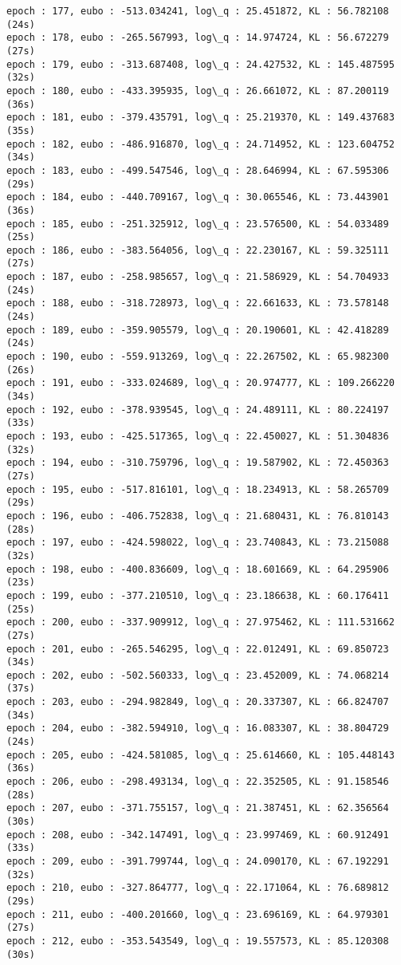 \documentclass[11pt]{article}
\begin{document}
\begin{Verbatim}[commandchars=\\\{\}]
epoch : 177, eubo : -513.034241, log\_q : 25.451872, KL : 56.782108 (24s)
epoch : 178, eubo : -265.567993, log\_q : 14.974724, KL : 56.672279 (27s)
epoch : 179, eubo : -313.687408, log\_q : 24.427532, KL : 145.487595 (32s)
epoch : 180, eubo : -433.395935, log\_q : 26.661072, KL : 87.200119 (36s)
epoch : 181, eubo : -379.435791, log\_q : 25.219370, KL : 149.437683 (35s)
epoch : 182, eubo : -486.916870, log\_q : 24.714952, KL : 123.604752 (34s)
epoch : 183, eubo : -499.547546, log\_q : 28.646994, KL : 67.595306 (29s)
epoch : 184, eubo : -440.709167, log\_q : 30.065546, KL : 73.443901 (36s)
epoch : 185, eubo : -251.325912, log\_q : 23.576500, KL : 54.033489 (25s)
epoch : 186, eubo : -383.564056, log\_q : 22.230167, KL : 59.325111 (27s)
epoch : 187, eubo : -258.985657, log\_q : 21.586929, KL : 54.704933 (24s)
epoch : 188, eubo : -318.728973, log\_q : 22.661633, KL : 73.578148 (24s)
epoch : 189, eubo : -359.905579, log\_q : 20.190601, KL : 42.418289 (24s)
epoch : 190, eubo : -559.913269, log\_q : 22.267502, KL : 65.982300 (26s)
epoch : 191, eubo : -333.024689, log\_q : 20.974777, KL : 109.266220 (34s)
epoch : 192, eubo : -378.939545, log\_q : 24.489111, KL : 80.224197 (33s)
epoch : 193, eubo : -425.517365, log\_q : 22.450027, KL : 51.304836 (32s)
epoch : 194, eubo : -310.759796, log\_q : 19.587902, KL : 72.450363 (27s)
epoch : 195, eubo : -517.816101, log\_q : 18.234913, KL : 58.265709 (29s)
epoch : 196, eubo : -406.752838, log\_q : 21.680431, KL : 76.810143 (28s)
epoch : 197, eubo : -424.598022, log\_q : 23.740843, KL : 73.215088 (32s)
epoch : 198, eubo : -400.836609, log\_q : 18.601669, KL : 64.295906 (23s)
epoch : 199, eubo : -377.210510, log\_q : 23.186638, KL : 60.176411 (25s)
epoch : 200, eubo : -337.909912, log\_q : 27.975462, KL : 111.531662 (27s)
epoch : 201, eubo : -265.546295, log\_q : 22.012491, KL : 69.850723 (34s)
epoch : 202, eubo : -502.560333, log\_q : 23.452009, KL : 74.068214 (37s)
epoch : 203, eubo : -294.982849, log\_q : 20.337307, KL : 66.824707 (34s)
epoch : 204, eubo : -382.594910, log\_q : 16.083307, KL : 38.804729 (24s)
epoch : 205, eubo : -424.581085, log\_q : 25.614660, KL : 105.448143 (36s)
epoch : 206, eubo : -298.493134, log\_q : 22.352505, KL : 91.158546 (28s)
epoch : 207, eubo : -371.755157, log\_q : 21.387451, KL : 62.356564 (30s)
epoch : 208, eubo : -342.147491, log\_q : 23.997469, KL : 60.912491 (33s)
epoch : 209, eubo : -391.799744, log\_q : 24.090170, KL : 67.192291 (32s)
epoch : 210, eubo : -327.864777, log\_q : 22.171064, KL : 76.689812 (29s)
epoch : 211, eubo : -400.201660, log\_q : 23.696169, KL : 64.979301 (27s)
epoch : 212, eubo : -353.543549, log\_q : 19.557573, KL : 85.120308 (30s)

\end{Verbatim}
\end{document}
